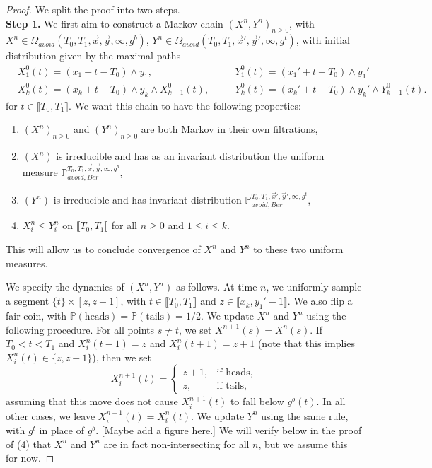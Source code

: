 \begin{proof} We split the proof into two steps.\\
	
	\noindent\textbf{Step 1.} We first aim to construct a Markov chain $(X^n,Y^n)_{n\geq 0}$, with \\$X^n\in \Omega_{avoid}(T_0,T_1,\vec{x},\vec{y},\infty,g^b)$, $Y^n\in \Omega_{avoid}(T_0,T_1,\vec{x}',\vec{y}',\infty,g^t)$, with initial distribution given by the maximal paths
	\begin{align*}
	& X^0_1(t)=(x_1+t-T_0) \wedge y_1,\quad && Y^0_1(t)=(x_1'+t-T_0) \wedge y_1'\\
	& X^0_k(t)=(x_k+t-T_0) \wedge y_k \wedge X^0_{k-1}(t), \quad && Y^0_k(t)=(x_k'+t-T_0) \wedge y_k' \wedge Y^0_{k-1}(t).
	\end{align*}
	for $t\in\llbracket T_0, T_1\rrbracket$. We want this chain to have the following properties: 
	\begin{enumerate}[label=(\arabic*)]
		
		\item $(X^n)_{n\geq 0}$ and $(Y^n)_{n\geq 0}$ are both Markov in their own filtrations,
		
		\item $(X^n)$ is irreducible and has as an invariant distribution the uniform measure $\mathbb{P}_{avoid,Ber}^{T_0,T_1,\vec{x},\vec{y},\infty,g^b}$,
		
		\item $(Y^n)$ is irreducible and has invariant distribution $\mathbb{P}_{avoid,Ber}^{T_0,T_1,\vec{x}',\vec{y}',\infty,g^t}$,
		
		\item $X^n_i\leq Y^n_i$ on $\llbracket T_0, T_1\rrbracket$ for all $n\geq 0$ and $1\leq i \leq k$.
		
	\end{enumerate}
	
	\noindent This will allow us to conclude convergence of $X^n$ and $Y^n$ to these two uniform measures.
	
	We specify the dynamics of $(X^n, Y^n)$ as follows. At time $n$, we uniformly sample a segment $\{t\}\times[z, z+1]$, with $t\in\llbracket T_0, T_1\rrbracket$ and $z\in\llbracket x_k,y_1'-1\rrbracket$. We also flip a fair coin, with $\mathbb{P}(\textrm{heads})=\mathbb{P}(\textrm{tails})=1/2$. We update $X^n$ and $Y^n$ using the following procedure. For all points $s\neq t$, we set $X^{n+1}(s) = X^n(s)$. If $T_0 < t < T_1$ and $X^n_i(t-1)=z$ and $X^n_i(t+1)=z+1$ (note that this implies $X^n_i(t)\in\{z,z+1\}$), then we set
	\[
	X^{n+1}_i(t) = \begin{cases}
	z+1, & \textrm{if heads},\\
	z, & \textrm{if tails},
	\end{cases}
	\]
	assuming that this move does not cause $X^{n+1}_i(t)$ to fall below $g^b(t)$. In all other cases, we leave $X^{n+1}_i(t)=X^n_i(t)$. We update $Y^n$ using the same rule, with $g^t$ in place of $g^b$. [Maybe add a figure here.] We will verify below in the proof of (4) that $X^n$ and $Y^n$ are in fact non-intersecting for all $n$, but we assume this for now.
	

\end{proof}
